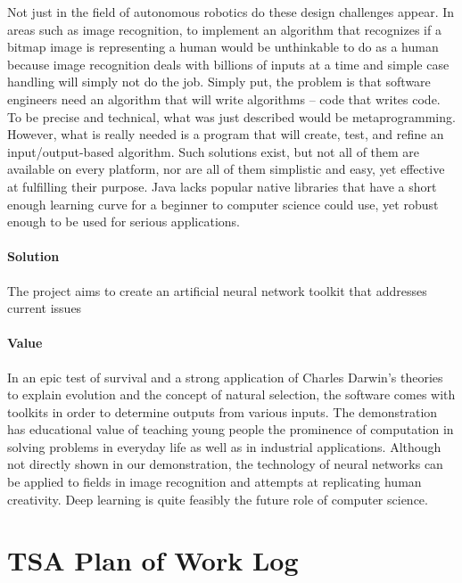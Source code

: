 \documentclass[letterpaper, 10pt]{article}
\begin{document}
	Not just in the field of autonomous robotics do these design challenges appear. In areas such as image recognition, to implement an algorithm that recognizes if a bitmap image is representing a human would be unthinkable to do as a human because image recognition deals with billions of inputs at a time and simple case handling will simply not do the job. Simply put, the problem is that software engineers need an algorithm that will write algorithms -- code that writes code. To be precise and technical, what was just described would be metaprogramming. However, what is really needed is a program that will create, test, and refine an input/output-based algorithm. Such solutions exist, but not all of them are available on every platform, nor are all of them simplistic and easy, yet effective at fulfilling their purpose. Java lacks popular native libraries that have a short enough learning curve for a beginner to computer science could use, yet robust enough to be used for serious applications.
	\paragraph{Solution} The project aims to create an artificial neural network toolkit that addresses current issues
\clearpage
	\paragraph{Value} In an epic test of survival and a strong application of Charles Darwin's theories to explain evolution and the concept of natural selection, the software comes with toolkits in order to determine outputs from various inputs. The demonstration has educational value of teaching young people the prominence of computation in solving problems in everyday life as well as in industrial applications. Although not directly shown in our demonstration, the technology of neural networks can be applied to fields in image recognition and attempts at replicating human creativity. Deep learning is quite feasibly the future role of computer science.
\cleardoublepage
\section{TSA Plan of Work Log}
	
\end{document}
